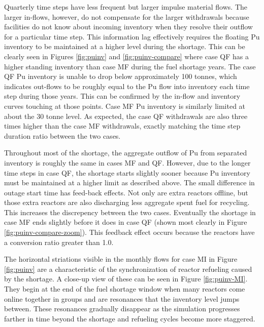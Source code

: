 \documentclass{style}
\begin{document}
Quarterly time steps have less frequent but larger impulse material flows.
The larger in-flows, however, do not compensate for the larger withdrawals
because facilities do not know about incoming inventory when they resolve
their outflow for a particular time step.  This information lag effectively
requires the floating Pu inventory to be maintained at a higher level during
the shortage.  This can be clearly seen in Figures \ref{fig:puinv} and \ref{fig:puinv-compare} where case QF has a higher
standing inventory than case MF during the fuel shortage years.  The case QF Pu
inventory is unable to drop below approximately 100 tonnes, which indicates
out-flows to be roughly equal to the Pu flow into inventory each time step
during those years.  This can be confirmed by the in-flow and inventory curves
touching at those points.  Case MF Pu inventory is similarly limited at about
the 30 tonne level.  As expected, the case QF withdrawals are also three times
higher than the case MF withdrawals, exactly matching the time step duration ratio
between the two cases.

Throughout most of the shortage, the aggregate outflow of Pu from separated
inventory is roughly the same in cases MF and QF.  However, due to the longer
time steps in case QF, the shortage starts slightly sooner because Pu inventory
must be maintained at a higher limit as described above.  The small difference
in outage start time has feed-back effects.  Not only are extra reactors
offline, but those extra reactors are also discharging less aggregate spent
fuel for recycling.  This increases the discrepency between the two
cases. Eventually the shortage in case MF ends slightly before it does in case
QF (shown most clearly in Figure \ref{fig:puinv-compare-zoom}). This feedback effect occurs because the reactors have a
conversion ratio greater than 1.0.

The horizontal striations visible in the monthly flows for case MI in Figure
\ref{fig:puinv} are a characteristic of the synchronization of reactor
refueling caused by the shortage.  A close-up view of these can be seen in
Figure \ref{fig:puinv-MI}. They begin at the end of the fuel shortage window
when many reactors come online together in groups and are resonances that the
inventory level jumps between.  These resonances gradually disappear as the
simulation progresses farther in time beyond the shortage and refueling cycles
become more staggered.
\end{document}
